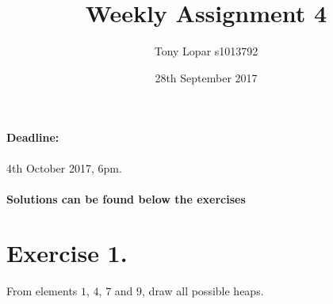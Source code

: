 \documentclass{article}
\begin{document}
\title{Weekly Assignment 4}
\date{28th September 2017}
\author{Tony Lopar s1013792}
\maketitle

\paragraph{Deadline:} 4th October 2017, 6pm.
\paragraph{Solutions can be found below the exercises}



\section*{Exercise 1.}
From elements $1$, $4$, $7$ and $9$, draw all possible heaps.
\end{document}
